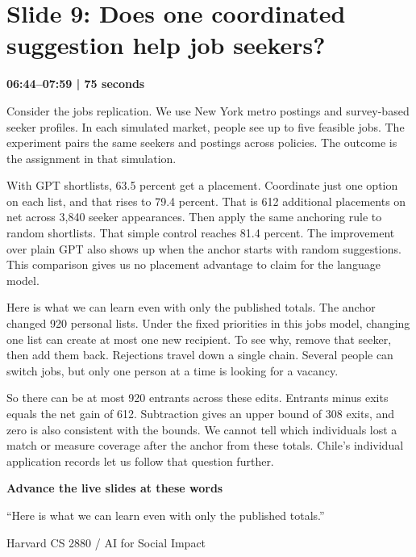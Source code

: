 \documentclass[11pt]{article}
\begin{document}
\section*{Slide 9: Does one coordinated suggestion help job seekers?}
{\color{navy}\textbf{06:44--07:59 | 75 seconds}}\par\medskip
Consider the jobs replication. We use New York metro postings and survey-based seeker profiles. In each simulated market, people see up to five feasible jobs. The experiment pairs the same seekers and postings across policies. The outcome is the assignment in that simulation.
\par
With GPT shortlists, 63.5 percent get a placement. Coordinate just one option on each list, and that rises to 79.4 percent. That is 612 additional placements on net across 3,840 seeker appearances. Then apply the same anchoring rule to random shortlists. That simple control reaches 81.4 percent. The improvement over plain GPT also shows up when the anchor starts with random suggestions. This comparison gives us no placement advantage to claim for the language model.
\par
Here is what we can learn even with only the published totals. The anchor changed 920 personal lists. Under the fixed priorities in this jobs model, changing one list can create at most one new recipient. To see why, remove that seeker, then add them back. Rejections travel down a single chain. Several people can switch jobs, but only one person at a time is looking for a vacancy.
\par
So there can be at most 920 entrants across these edits. Entrants minus exits equals the net gain of 612. Subtraction gives an upper bound of 308 exits, and zero is also consistent with the bounds. We cannot tell which individuals lost a match or measure coverage after the anchor from these totals. Chile's individual application records let us follow that question further.
\par
\vfill{\small\textbf{Advance the live slides at these words}\par}
{\small ``Here is what we can learn even with only the published totals.''}\par
\newpage
{\small Harvard CS 2880 / AI for Social Impact}\par
\end{document}
